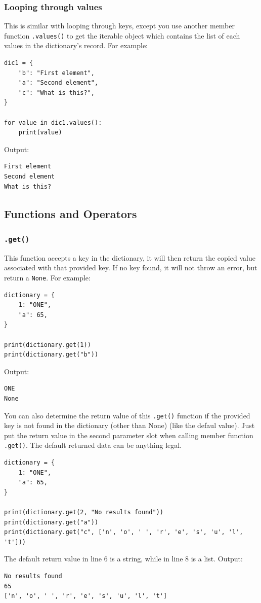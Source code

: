 \documentclass[12pt]{book}
\begin{document}
\subsubsection{Looping through values}
\label{sec:org9730e4e}
This is similar with looping through keys, except you use another member function \texttt{.values()} to get the iterable object which contains the list of each values in the dictionary's record. For example:
\begin{verbatim}
dic1 = {
    "b": "First element",
    "a": "Second element",
    "c": "What is this?",
}

for value in dic1.values():
    print(value)
\end{verbatim}
Output:
\begin{verbatim}
First element
Second element
What is this?
\end{verbatim}

\subsection{Functions and Operators}
\label{sec:org7e09569}
\subsubsection{\texttt{.get()}}
\label{sec:orgbc42deb}
This function accepts a key in the dictionary, it  will then return the copied value associated with that provided key. If no key found, it will not throw an error, but return a \texttt{None}. For example:
\begin{verbatim}
dictionary = {
    1: "ONE",
    "a": 65,
}

print(dictionary.get(1))
print(dictionary.get("b"))
\end{verbatim}
Output:
\begin{verbatim}
ONE
None
\end{verbatim}

You can also determine the return value of this \texttt{.get()} function if the provided key is not found in the dictionary (other than None) (like the defaul value). Just put the return value in the second parameter slot when calling member function \texttt{.get()}. The default returned data can be anything legal.
\begin{verbatim}
dictionary = {
    1: "ONE",
    "a": 65,
}

print(dictionary.get(2, "No results found"))
print(dictionary.get("a"))
print(dictionary.get("c", ['n', 'o', ' ', 'r', 'e', 's', 'u', 'l', 't']))
\end{verbatim}
The default return value in line 6 is a string, while in line 8 is a list. Output:
\begin{verbatim}
No results found
65
['n', 'o', ' ', 'r', 'e', 's', 'u', 'l', 't']
\end{verbatim}
\end{document}
